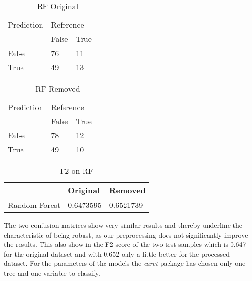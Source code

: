\begin{table}[!htbp]
\centering
\caption{RF Original}
\vspace{0.1cm}
\label{rf-orig}
\begin{tabular}{|l|ll|ll}
\cline{1-3}
Prediction & \multicolumn{2}{l|}{Reference} &  &  \\
           & False          & True          &  &  \\ \cline{2-3}
False      & 76              & 11             &  &  \\
True       & 49              & 13             &  &  \\ \cline{1-3}
\end{tabular}
\end{table}

\begin{table}[!htbp]
\centering
\caption{RF Removed}
\vspace{0.1cm}
\label{rf-remov}
\begin{tabular}{|l|ll|ll}
\cline{1-3}
Prediction & \multicolumn{2}{l|}{Reference} &  &  \\
           & False          & True          &  &  \\ \cline{2-3}
False      & 78              & 12             &  &  \\
True       & 49              & 10             &  &  \\ \cline{1-3}
\end{tabular}
\end{table}

\begin{table}[!htbp]
\centering
\caption{F2 on RF}
\vspace{0.1cm}
\label{rf-f2}
\begin{tabular}{|l|l|l|}
\hline
      & Original & Removed \\ \hline
Random Forest & 0.6473595 & 0.6521739       \\ \hline
\end{tabular}
\end{table}



The two confusion matrices show very similar results and thereby underline the characteristic of being robust, as our preprocessing does not significantly improve the results. This also show in the F2 score of the two test samples which is 0.647 for the original dataset and with 0.652 only a little better for the processed dataset. For the parameters of the models the \textit{caret} package has chosen only one tree and one variable to classify.

